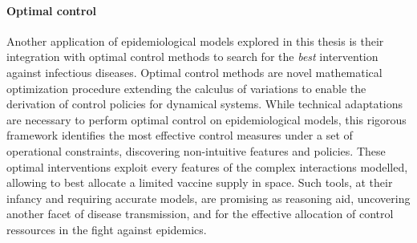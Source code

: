 \paragraph{Optimal control} Another application of epidemiological models explored in this thesis is their integration with optimal control methods to search for the \textit{best} intervention against infectious diseases. Optimal control methods are novel mathematical optimization procedure extending the calculus of variations to enable the derivation of control policies for dynamical systems. While technical adaptations are necessary to perform optimal control on epidemiological models, this rigorous framework identifies the most effective control measures under a set of operational constraints, discovering non-intuitive features and policies. These optimal interventions exploit every features of the complex interactions modelled, allowing to \eg best allocate a limited vaccine supply in space. Such tools, at their infancy and requiring accurate models, are promising as reasoning aid, uncovering another facet of disease transmission, and for the effective allocation of control ressources in the fight against epidemics.




